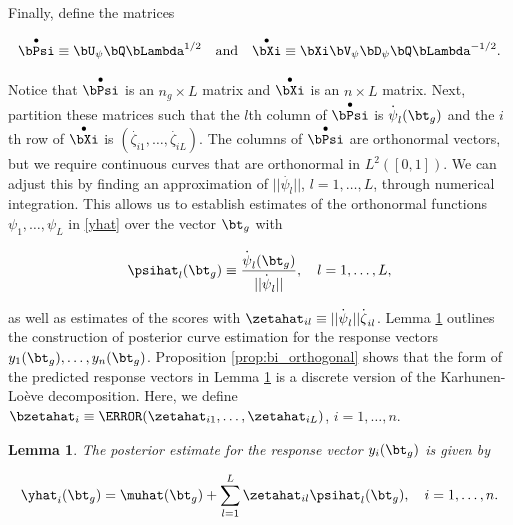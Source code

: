 \documentclass[ba]{imsart}
\numberwithin{equation}{section}
\theoremstyle{plain}
\newtheorem{lem}{Lemma}[section]
\begin{document}
Finally, define the matrices

\begin{equation}
	\overset{\bullet}{\bPsi} \equiv \bU_\psi \bQ \bLambda^{1/2} \quad
	\text{and} \quad
	\overset{\bullet}{\bXi} \equiv \bXi \bV_\psi \bD_\psi \bQ \bLambda^{-1/2}.
\label{psi_zeta_orth}
\end{equation}

\noindent Notice that $\overset{\bullet}{\bPsi}$ is an $n_g \times L$ matrix and
$\overset{\bullet}{\bXi}$ is an $n \times L$ matrix. Next, partition
these matrices such that the $l$th column of $\overset{\bullet}{\bPsi}$ is
$\overset{\textbf{.}}{\psi}_l (\bt_g)$ and the $i$th row of $\overset{\bullet}{\bXi}$ is
$(\overset{\textbf{.}}{\zeta}_{i1}, \dots, \overset{\textbf{.}}{\zeta}_{iL})$.
The columns of $\overset{\bullet}{\bPsi}$ are orthonormal vectors, but we require continuous curves that are orthonormal in
$L^2 ([0, 1])$. We can adjust this by finding an approximation of $|| \overset{\textbf{.}}\psi_l ||$, $l = 1, \dots, L$,
through numerical
integration. This allows us to establish estimates of the orthonormal functions $\psi_1, \dots, \psi_L$ in
\eqref{yhat} over the vector $\bt_g$ with

\begin{equation}
	\psihat_l (\bt_g) \equiv \frac{\overset{\textbf{.}}{\psi}_l (\bt_g)}{|| \overset{\textbf{.}}{\psi}_l ||}, \quad l = 1, \dots, L,
\label{psi_star}
\end{equation}

\noindent as well as estimates of the scores with
$\zetahat_{il} \equiv || \overset{\textbf{.}}{\psi}_l || \overset{\textbf{.}}{\zeta}_{il}$.
Lemma \ref{lem:response_est} outlines the construction of posterior curve estimation for the
response vectors $y_1 (\bt_g),
\dots, y_n (\bt_g)$. Proposition \ref{prop:bi_orthogonal} shows that the form of the predicted response vectors
in Lemma \ref{lem:response_est} is a discrete version of the Karhunen-Lo\`{e}ve decomposition. Here, we define
$\bzetahat_i \equiv \T{(\zetahat_{i1}, \dots, \zetahat_{iL})}$, $i = 1, \dots, n$.

\begin{lem}
	
	The posterior estimate for the response vector $y_i (\bt_g)$ is given by
	
	\begin{equation}
		\yhat_i (\bt_g) = \muhat (\bt_g) + \sum_{l=1}^L \zetahat_{il} \psihat_l (\bt_g), \quad i = 1, \dots, n.
	\label{post_curve_est}
	\end{equation}
	
\label{lem:response_est}
\end{lem}
\end{document}
